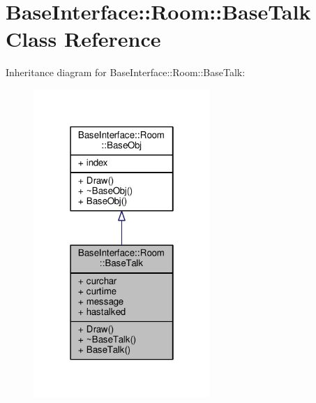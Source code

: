 \hypertarget{classBaseInterface_1_1Room_1_1BaseTalk}{}\section{Base\+Interface\+:\+:Room\+:\+:Base\+Talk Class Reference}
\label{classBaseInterface_1_1Room_1_1BaseTalk}


Inheritance diagram for Base\+Interface\+:\+:Room\+:\+:Base\+Talk\+:
\nopagebreak
\begin{figure}[H]
\begin{center}
\leavevmode
\includegraphics[width=190pt]{d0/d6c/classBaseInterface_1_1Room_1_1BaseTalk__inherit__graph}
\end{center}
\end{figure}


